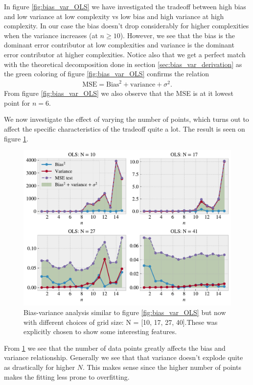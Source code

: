 \documentclass[norsk,a4paper,12pt]{scrartcl}
\begin{document}
In figure \ref{fig:bias_var_OLS} we have investigated the tradeoff between high bias and low variance at low complexity vs low bias and high variance at high complexity. In our case the bias doesn't drop considerably for higher complexities when the variance increases (at $n \ge 10$). However, we see that the bias is the dominant error contributor at low complexities and variance is the dominant error contributor at higher complexities. Notice also that we get a perfect match with the theoretical decomposition done in section \ref{sec:bias_var_derivation} as the green coloring of figure \ref{fig:bias_var_OLS} confirms the relation
\begin{align*}
    \text{MSE} = \text{Bias}^2 + \text{variance} + \sigma^2.
\end{align*}
From figure \ref{fig:bias_var_OLS} we also observe that the MSE is at it lowest point for $n = 6$. \par
We now investigate the effect of varying the number of points, which turns out to affect the specific characteristics of the tradeoff quite a lot. The result is seen on figure \ref{fig:bias_var_OLS_multi}.
\begin{figure}[H]
    \centering
    \includegraphics[width=\linewidth]{figures/bias_variance_tradeoff_OLS_2x2.pdf}
    \caption{Bias-variance analysis similar to figure \ref{fig:bias_var_OLS} but now with different choices of grid size: N = [10, 17, 27, 40].These was explicitly chosen to show some interesting features.}
     \label{fig:bias_var_OLS_multi}
\end{figure}

From \ref{fig:bias_var_OLS_multi} we see that the number of data points greatly affects the bias and variance relationship. Generally we see that that variance doesn't explode quite as drastically for higher $N$. This makes sense since the higher number of points makes the fitting less prone to overfitting. 
\end{document}

